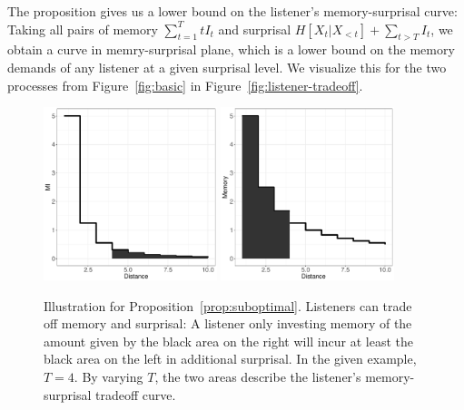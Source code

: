 \documentclass[11pt,letterpaper]{article}
\begin{document}
The proposition gives us a lower bound on the listener's memory-surprisal curve: Taking all pairs of memory $\sum_{t=1}^T t I_t$ and surprisal $H[X_t|X_{<t}] + \sum_{t > T} I_t$, we obtain a curve in memry-surprisal plane, which is a lower bound on the memory demands of any listener at a given surprisal level.
We visualize this for the two processes from Figure~\ref{fig:basic} in Figure~\ref{fig:listener-tradeoff}.

\begin{figure}
\includegraphics[width=0.45\textwidth]{toy/add-surp.pdf}
\includegraphics[width=0.45\textwidth]{toy/lower-mem.pdf}
	\caption{Illustration for Proposition~\ref{prop:suboptimal}. Listeners can trade off memory and surprisal: A listener only investing memory of the amount given by the black area on the right will incur at least the black area on the left in additional surprisal. In the given example, $T=4$. By varying $T$, the two areas describe the listener's memory-surprisal tradeoff curve.}\label{fig:listener-tradeoff-decay}
\end{figure}
\end{document}

